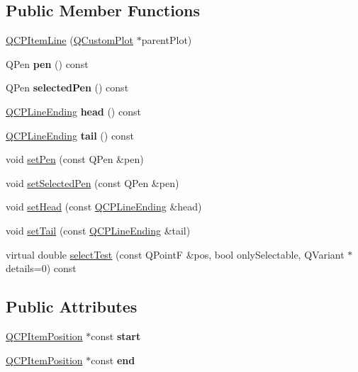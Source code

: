 \subsection*{Public Member Functions}
\begin{DoxyCompactItemize}
\item 
\hyperlink{class_q_c_p_item_line_a17804b7f64961c6accf25b61e85142e3}{Q\+C\+P\+Item\+Line} (\hyperlink{class_q_custom_plot}{Q\+Custom\+Plot} $\ast$parent\+Plot)
\item 
\hypertarget{class_q_c_p_item_line_a712e5a7f59db3f4c588dfc370a63e225}{}\label{class_q_c_p_item_line_a712e5a7f59db3f4c588dfc370a63e225} 
Q\+Pen {\bfseries pen} () const
\item 
\hypertarget{class_q_c_p_item_line_ae1782c4fbecd38054ec3d49d8572a5e5}{}\label{class_q_c_p_item_line_ae1782c4fbecd38054ec3d49d8572a5e5} 
Q\+Pen {\bfseries selected\+Pen} () const
\item 
\hypertarget{class_q_c_p_item_line_a6cdc9e87e17418d4b0e66eaa0f041407}{}\label{class_q_c_p_item_line_a6cdc9e87e17418d4b0e66eaa0f041407} 
\hyperlink{class_q_c_p_line_ending}{Q\+C\+P\+Line\+Ending} {\bfseries head} () const
\item 
\hypertarget{class_q_c_p_item_line_ac085d3939ec11d7a4d592dc2ed578360}{}\label{class_q_c_p_item_line_ac085d3939ec11d7a4d592dc2ed578360} 
\hyperlink{class_q_c_p_line_ending}{Q\+C\+P\+Line\+Ending} {\bfseries tail} () const
\item 
void \hyperlink{class_q_c_p_item_line_a572528dab61c1abe205822fbd5db4b27}{set\+Pen} (const Q\+Pen \&pen)
\item 
void \hyperlink{class_q_c_p_item_line_a3e2fec44503277e77717e9c24f87f1ea}{set\+Selected\+Pen} (const Q\+Pen \&pen)
\item 
void \hyperlink{class_q_c_p_item_line_aebf3d687114d584e0459db6759e2c3c3}{set\+Head} (const \hyperlink{class_q_c_p_line_ending}{Q\+C\+P\+Line\+Ending} \&head)
\item 
void \hyperlink{class_q_c_p_item_line_ac264222c3297a7efe33df9345c811a5f}{set\+Tail} (const \hyperlink{class_q_c_p_line_ending}{Q\+C\+P\+Line\+Ending} \&tail)
\item 
virtual double \hyperlink{class_q_c_p_item_line_ae6cc5183f568e5fa9d7827abe4d405b5}{select\+Test} (const Q\+PointF \&pos, bool only\+Selectable, Q\+Variant $\ast$details=0) const
\end{DoxyCompactItemize}
\subsection*{Public Attributes}
\begin{DoxyCompactItemize}
\item 
\hypertarget{class_q_c_p_item_line_a602da607a09498b0f152ada1d6851bc5}{}\label{class_q_c_p_item_line_a602da607a09498b0f152ada1d6851bc5} 
\hyperlink{class_q_c_p_item_position}{Q\+C\+P\+Item\+Position} $\ast$const {\bfseries start}
\item 
\hypertarget{class_q_c_p_item_line_a15598864c1c22a2497a1979c4980c4e1}{}\label{class_q_c_p_item_line_a15598864c1c22a2497a1979c4980c4e1} 
\hyperlink{class_q_c_p_item_position}{Q\+C\+P\+Item\+Position} $\ast$const {\bfseries end}
\end{DoxyCompactItemize}
